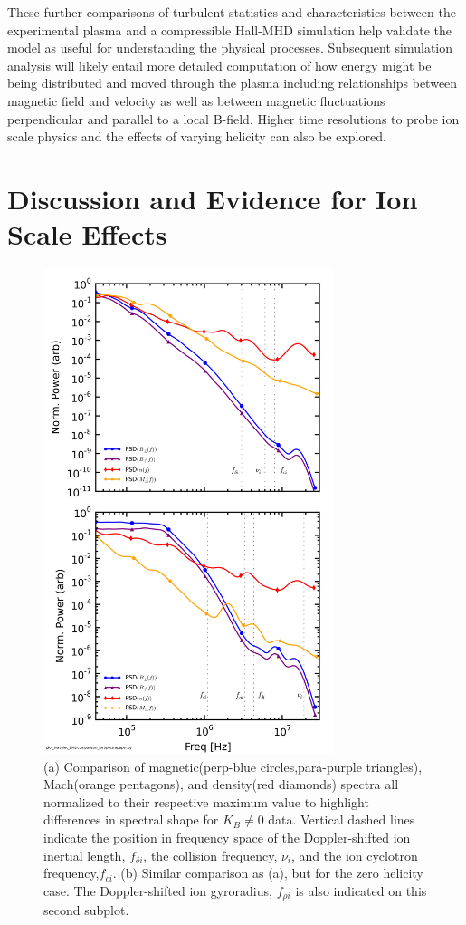 \documentclass[aip,prl,amsmath,amssymb,reprint,superscriptaddress]{revtex4-1} %
\begin{document}
These further comparisons of turbulent statistics and characteristics between the experimental plasma and a compressible Hall-MHD simulation help validate the model as useful for understanding the physical processes. Subsequent simulation analysis will likely entail more detailed computation of how energy might be being distributed and moved through the plasma including relationships between magnetic field and velocity as well as between magnetic fluctuations perpendicular and parallel to a local B-field. Higher time resolutions to probe ion scale physics and the effects of varying helicity can also be explored.

\section{Discussion and Evidence for Ion Scale Effects}\label{sec:ionscale}

\begin{figure}[!htbp]
\centerline{
\includegraphics[width=8.5cm]{BvsDensvsFlowspec_1mWb_and_0mWbcomp_40t60us}}
\caption{\label{fig:BMD_comp} (a) Comparison of magnetic(perp-blue circles,para-purple triangles), Mach(orange pentagons), and density(red diamonds) spectra all normalized to their respective maximum value to highlight differences in spectral shape for $K_{B}\neq 0$ data. Vertical dashed lines indicate the position in frequency space of the Doppler-shifted ion inertial length, $f_{\delta i}$, the collision frequency, $\nu_i$, and the ion cyclotron frequency,$f_{ci}$. (b) Similar comparison as (a), but for the zero helicity case. The Doppler-shifted ion gyroradius, $f_{\rho i}$ is also indicated on this second subplot.}
\end{figure}
\end{document}
